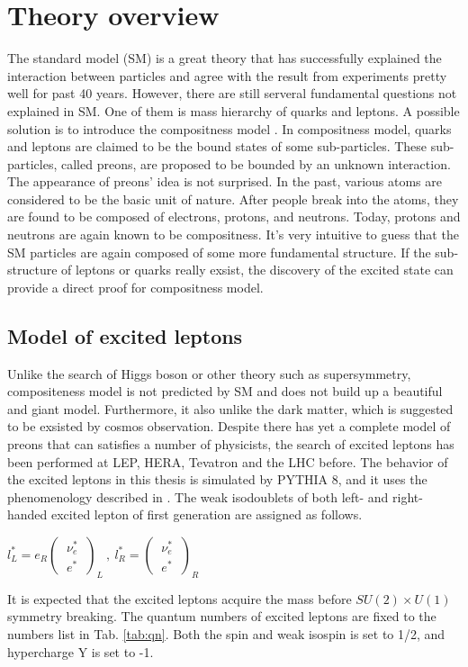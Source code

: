 \section{Theory overview}
The standard model (SM) is a great theory that has successfully explained the interaction between particles and agree with the result from experiments pretty well for past 40 
years. However, there are still serveral fundamental questions not explained in SM. One of them is mass hierarchy of quarks and leptons. 
\newline A possible solution is to introduce the compositness model \cite{preons-idea, compositeness, eichten}.  
In compositness model, quarks and leptons are claimed to be the bound states of some sub-particles. These sub-particles, called preons,  
are proposed to be bounded by an unknown interaction. The appearance of preons' idea is not surprised. In the past, various atoms are considered to be the basic unit of nature. After people break into the atoms, 
they are found to be composed of electrons, protons, and neutrons. Today, protons and neutrons are again known to be compositness. It's very intuitive to guess that the SM particles are again composed of some more fundamental 
structure. If the sub-structure of leptons or quarks really exsist, the discovery of the excited state can provide a direct proof for compositness model.  

\subsection{Model of excited leptons}
Unlike the search of Higgs boson or other theory such as supersymmetry, compositeness model is not predicted by SM and does not build up a beautiful and giant model. Furthermore, it also unlike the dark matter, which is 
suggested to be exsisted by cosmos observation. Despite there has yet a complete model of preons that can satisfies a number of physicists, the search of excited leptons has been performed at
LEP, HERA, Tevatron and the LHC before\cite{tevatron1, tevatron2, tevatron3, tevatron4, EXO-10-016, an-11-452, an-12-013, atlas2011-limit}. The behavior of the excited leptons in this thesis is simulated 
by PYTHIA 8\cite{Sjostrand:2006za}, and it uses the phenomenology described in \cite{compositeness}. 
\newline
The weak isodoublets of both left- and right-handed excited lepton of first generation are assigned as follows.

\begin{center}
$l^{*}_{L} = e_{R}\left(
\begin{aligned}
~\nu^{*}_{e}~ \\
~e^{*}~
\end{aligned}
\right)_{L}
 ~,~ 
l^{*}_{R} = \left(
\begin{aligned}
~\nu^{*}_{e}~ \\
~e^{*}~
\end{aligned}
\right)_{R}
 $
\end{center}   
It is expected that the excited leptons acquire the mass before $SU(2)\times U(1)$ symmetry breaking. The quantum numbers of excited leptons are fixed to the numbers list in Tab. \ref{tab:qn}.
Both the spin and weak isospin is set to 1/2, and hypercharge Y is set to -1.

